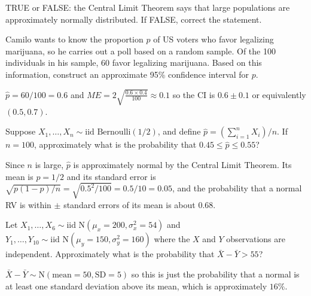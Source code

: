 \documentclass[addpoints,12pt]{exam}
\begin{document}
\begin{questions}

\question TRUE or FALSE: the Central Limit Theorem says that large populations are approximately normally distributed. If FALSE, correct the statement.

  \question Camilo wants to know the proportion $p$ of US voters who favor legalizing marijuana, so he carries out a poll based on a random sample.
  Of the 100 individuals in his sample, 60 favor legalizing marijuana.
  Based on this information, construct an approximate 95\% confidence interval for $p$.
  \begin{solution}
    $\widehat{p} = 60/100 = 0.6$ and $ME = 2\displaystyle\sqrt{\frac{0.6 \times 0.4}{100}}\approx 0.1$ so the CI is $0.6 \pm 0.1$ or equivalently $(0.5, 0.7)$.
  \end{solution}

  \question Suppose $X_1, \dots, X_n \sim \mbox{iid Bernoulli}(1/2)$, and define $\widehat{p} = (\sum_{i=1}^n X_i)/n$.
  If $n=100$, approximately what is the probability that $0.45 \leq \widehat{p} \leq 0.55$?
  \begin{solution}
    Since $n$ is large, $\widehat{p}$ is approximately normal by the Central Limit Theorem. 
    Its mean is $p = 1/2$ and its standard error is $\sqrt{p(1-p)/n} = \sqrt{0.5^2/100}= 0.5/10 = 0.05$, and the probability that a normal RV is within $\pm$ standard errors of its mean is about 0.68.
  \end{solution}


  \question Let $X_1, \dots, X_6 \sim \mbox{iid N}(\mu_x = 200, \sigma_x^2 = 54)$ and $Y_1, \dots, Y_{10} \sim \mbox{iid N}(\mu_y = 150, \sigma_y^2 = 160)$ where the $X$ and $Y$ observations are independent.
  Approximately what is the probability that $\bar{X} - \bar{Y} > 55$? 
  \begin{solution}
    $\bar{X} - \bar{Y} \sim \mbox{N}(\mbox{mean} = 50, \mbox{SD} = 5)$ so this is just the probability that a normal is at least one standard deviation above its mean, which is approximately $16\%$.
  \end{solution}


\end{questions}
\end{document}
